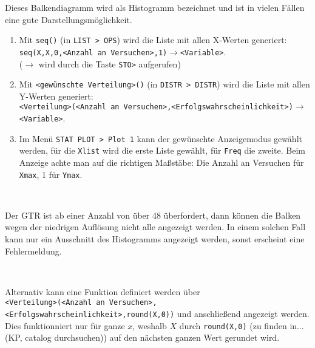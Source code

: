 \documentclass[main.tex]{subfiles}
\begin{document}
\begin{center}
\end{center}
\begin{Bemerkung}
  Dieses Balkendiagramm wird als Histogramm bezeichnet und ist in vielen Fällen eine gute Darstellungsmöglichkeit.
\end{Bemerkung}
\begin{GTR-Tipp}
  \begin{enumerate}
    \item Mit \texttt{seq()} (in \texttt{LIST > OPS}) wird die Liste mit allen X-Werten generiert:\\
    \texttt{seq(X,X,0,<Anzahl an Versuchen>,1)}$\rightarrow$\texttt{<Variable>}. \\
    ($\rightarrow$ wird durch die Taste \texttt{STO>} aufgerufen)
    \item Mit \texttt{<gewünschte Verteilung>()} (in \texttt{DISTR > DISTR}) wird die Liste mit allen Y-Werten generiert:\\
    \texttt{<Verteilung>(<Anzahl an Versuchen>,<Erfolgswahrscheinlichkeit>)}$\rightarrow$\texttt{<Variable>}.
    \item Im Menü \texttt{STAT PLOT > Plot 1} kann der gewünschte Anzeigemodus gewählt werden, für die \texttt{Xlist} wird die erste Liste gewählt, für \texttt{Freq} die zweite. Beim Anzeige achte man auf die richtigen Maßstäbe: Die Anzahl an Versuchen für \texttt{Xmax}, 1 für \texttt{Ymax}.
  \end{enumerate}\\
  \begin{Bemerkung}
    Der GTR ist ab einer Anzahl von über 48 überfordert, dann können die Balken wegen der niedrigen Auflösung nicht alle angezeigt werden. In einem solchen Fall kann nur ein Ausschnitt des Histogramms angezeigt werden, sonst erscheint eine Fehlermeldung.
  \end{Bemerkung}\\
  \begin{Bemerkung}
    Alternativ kann eine Funktion definiert werden über \\\texttt{<Verteilung>(<Anzahl an Versuchen>,<Erfolgswahrscheinlichkeit>,round(X,0))} und anschließend angezeigt werden.\\
    Dies funktionniert nur für ganze $x$, weshalb $X$ durch \texttt{round(X,0)} (zu finden in... (KP, catalog durchsuchen)) auf den nächsten ganzen Wert gerundet wird.
  \end{Bemerkung}
\end{GTR-Tipp}
\end{document}
